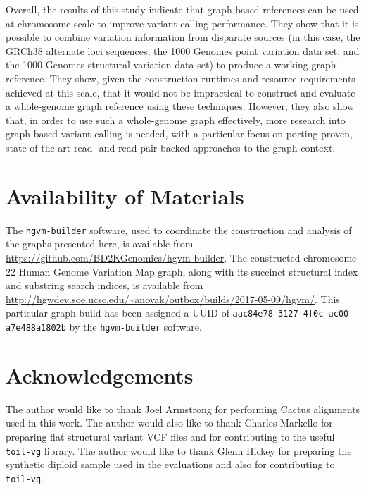 Overall, the results of this study indicate that graph-based references can be used at chromosome scale to improve variant calling performance. They show that it is possible to combine variation information from disparate sources (in this case, the GRCh38 alternate loci sequences, the 1000 Genomes point variation data set, and the 1000 Genomes structural variation data set) to produce a working graph reference. They show, given the construction runtimes and resource requirements achieved at this scale, that it would not be impractical to construct and evaluate a whole-genome graph reference using these techniques. However, they also show that, in order to use such a whole-genome graph effectively, more research into graph-based variant calling is needed, with a particular focus on porting proven, state-of-the-art read- and read-pair-backed approaches to the graph context.


\section{Availability of Materials}

The \texttt{hgvm-builder} software, used to coordinate the construction and analysis of the graphs presented here, is available from \url{https://github.com/BD2KGenomics/hgvm-builder}. The constructed chromosome 22 Human Genome Variation Map graph, along with its succinct structural index and substring search indices, is available from \url{http://hgwdev.soe.ucsc.edu/~anovak/outbox/builds/2017-05-09/hgvm/}. This particular graph build has been assigned a UUID of \texttt{aac84e78-3127-4f0c-ac00-a7e488a1802b} by the \texttt{hgvm-builder} software.

\section{Acknowledgements}

The author would like to thank Joel Armstrong for performing Cactus alignments used in this work. The author would also like to thank Charles Markello for preparing flat structural variant VCF files and for contributing to the useful \texttt{toil-vg} library. The author would like to thank Glenn Hickey for preparing the synthetic diploid sample used in the evaluations and also for contributing to \texttt{toil-vg}.

